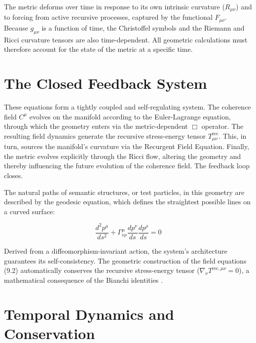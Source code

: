 The metric deforms over time in response to its own intrinsic curvature (\(R_{\mu\nu}\)) and to forcing from active recursive processes, captured by the functional \(F_{\mu\nu}\). Because \(g_{\mu\nu}\) is a function of time, the Christoffel symbols and the Riemann and Ricci curvature tensors are also time-dependent. All geometric calculations must therefore account for the state of the metric at a specific time.


\section{The Closed Feedback System}
\label{10.4:the_closed_feedback_system}

These equations form a tightly coupled and self-regulating system. The coherence field \(C^\mu\) evolves on the manifold according to the Euler-Lagrange equation, through which the geometry enters via the metric-dependent \(\Box\) operator. The resulting field dynamics generate the recursive stress-energy tensor \(T^{\text{rec}}_{\mu\nu}\). This, in turn, sources the manifold's curvature via the Recurgent Field Equation. Finally, the metric evolves explicitly through the Ricci flow, altering the geometry and thereby influencing the future evolution of the coherence field. The feedback loop closes.

The natural paths of semantic structures, or test particles, in this geometry are described by the geodesic equation, which defines the straightest possible lines on a curved surface:

\begin{equation}
\frac{d^2 p^\mu}{ds^2} + \Gamma^\mu_{\nu\rho} \frac{dp^\nu}{ds} \frac{dp^\rho}{ds} = 0
\end{equation}

Derived from a diffeomorphism-invariant action, the system's architecture guarantees its self-consistency. The geometric construction of the field equations (9.2) automatically conserves the recursive stress-energy tensor ($\nabla_\nu T^{\text{rec},\mu\nu} = 0$), a mathematical consequence of the Bianchi identities \autocite{Bianchi1902}.


\section{Temporal Dynamics and Conservation}
\label{10.5:temporal_dynamics_and_conservation}

